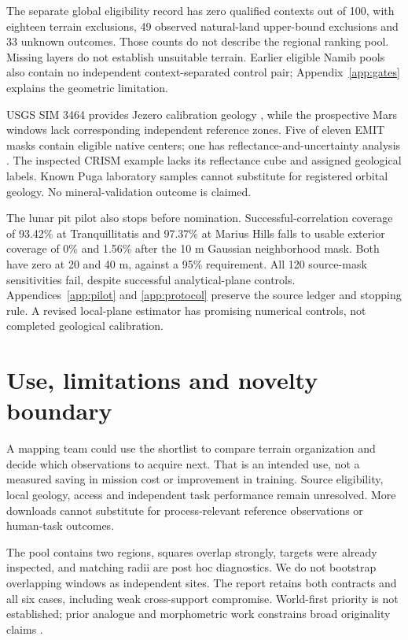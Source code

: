 The separate global eligibility record has zero qualified contexts out of 100, with eighteen terrain exclusions, 49 observed natural-land upper-bound exclusions and 33 unknown outcomes. Those counts do not describe the regional ranking pool. Missing layers do not establish unsuitable terrain. Earlier eligible Namib pools also contain no independent context-separated control pair; Appendix~\ref{app:gates} explains the geometric limitation.

USGS SIM 3464 provides Jezero calibration geology \cite{jezero}, while the prospective Mars windows lack corresponding independent reference zones. Five of eleven EMIT masks contain eligible native centers; one has reflectance-and-uncertainty analysis \cite{emit}. The inspected CRISM example lacks its reflectance cube and assigned geological labels. Known Puga laboratory samples cannot substitute for registered orbital geology. No mineral-validation outcome is claimed.

The lunar pit pilot also stops before nomination. Successful-correlation coverage of 93.42\% at Tranquillitatis and 97.37\% at Marius Hills falls to usable exterior coverage of 0\% and 1.56\% after the 10 m Gaussian neighborhood mask. Both have zero at 20 and 40 m, against a 95\% requirement. All 120 source-mask sensitivities fail, despite successful analytical-plane controls. Appendices~\ref{app:pilot} and \ref{app:protocol} preserve the source ledger and stopping rule. A revised local-plane estimator has promising numerical controls, not completed geological calibration.

\section{Use, limitations and novelty boundary}
A mapping team could use the shortlist to compare terrain organization and decide which observations to acquire next. That is an intended use, not a measured saving in mission cost or improvement in training. Source eligibility, local geology, access and independent task performance remain unresolved. More downloads cannot substitute for process-relevant reference observations or human-task outcomes.

The pool contains two regions, squares overlap strongly, targets were already inspected, and matching radii are post hoc diagnostics. We do not bootstrap overlapping windows as independent sites. The report retains both contracts and all six cases, including weak cross-support compromise. World-first priority is not established; prior analogue and morphometric work constrains broad originality claims \cite{roughness,jingpo,asymmetry,cotm,framework}.

